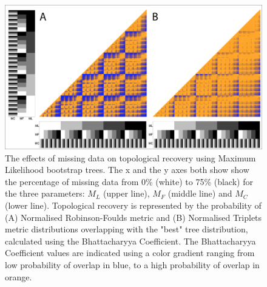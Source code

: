 \documentclass[12pt,letterpaper]{article}
\begin{document}
\begin{figure} 
\centering
    \includegraphics[width=1\textwidth]{SupplementaryFigures/PairwiseComp-Boot-RF+Tr-colour.png} %
    \caption{The effects of missing data on topological recovery using Maximum Likelihood bootstrap trees. The x and the y axes both show show the percentage of missing data from 0\% (white) to 75\% (black) for the three parameters: $M_{L}$ (upper line), $M_{F}$ (middle line) and $M_{C}$ (lower line). Topological recovery is represented by the probability of (A) Normalised Robinson-Foulds metric and (B) Normalised Triplets metric distributions overlapping with the "best" tree distribution, calculated using the Bhattacharyya Coefficient. The Bhattacharyya Coefficient values are indicated using a color gradient ranging from low probability of overlap in blue, to a high probability of overlap in orange.}
\label{Fig_Supp_paircomp_Boot}
\end{figure} 
\end{document}
